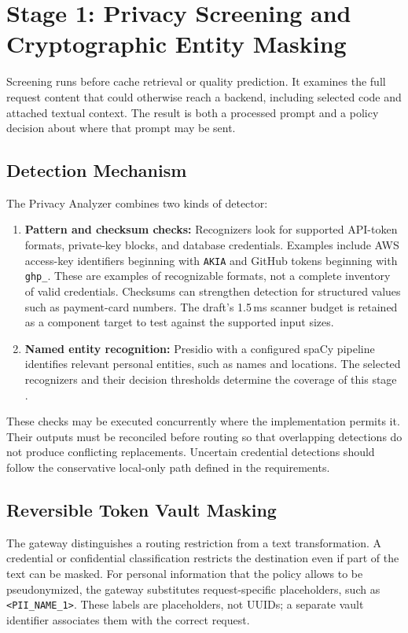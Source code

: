 \section{Stage 1: Privacy Screening and Cryptographic Entity Masking}
\label{sec:stage1-privacy}

Screening runs before cache retrieval or quality prediction. It examines the full request content that could otherwise reach a backend, including selected code and attached textual context. The result is both a processed prompt and a policy decision about where that prompt may be sent.

\subsection{Detection Mechanism}

The Privacy Analyzer combines two kinds of detector:
\begin{enumerate}
    \item \textbf{Pattern and checksum checks:} Recognizers look for supported API-token formats, private-key blocks, and database credentials. Examples include AWS access-key identifiers beginning with \texttt{AKIA} and GitHub tokens beginning with \texttt{ghp\_}. These are examples of recognizable formats, not a complete inventory of valid credentials. Checksums can strengthen detection for structured values such as payment-card numbers. The draft's 1.5\,ms scanner budget is retained as a component target to test against the supported input sizes.
    \item \textbf{Named entity recognition:} Presidio with a configured spaCy pipeline identifies relevant personal entities, such as names and locations. The selected recognizers and their decision thresholds determine the coverage of this stage \cite{ref:Presidio}.
\end{enumerate}

These checks may be executed concurrently where the implementation permits it. Their outputs must be reconciled before routing so that overlapping detections do not produce conflicting replacements. Uncertain credential detections should follow the conservative local-only path defined in the requirements.

\subsection{Reversible Token Vault Masking}

The gateway distinguishes a routing restriction from a text transformation. A credential or confidential classification restricts the destination even if part of the text can be masked. For personal information that the policy allows to be pseudonymized, the gateway substitutes request-specific placeholders, such as \texttt{<PII\_NAME\_1>}. These labels are placeholders, not UUIDs; a separate vault identifier associates them with the correct request.

